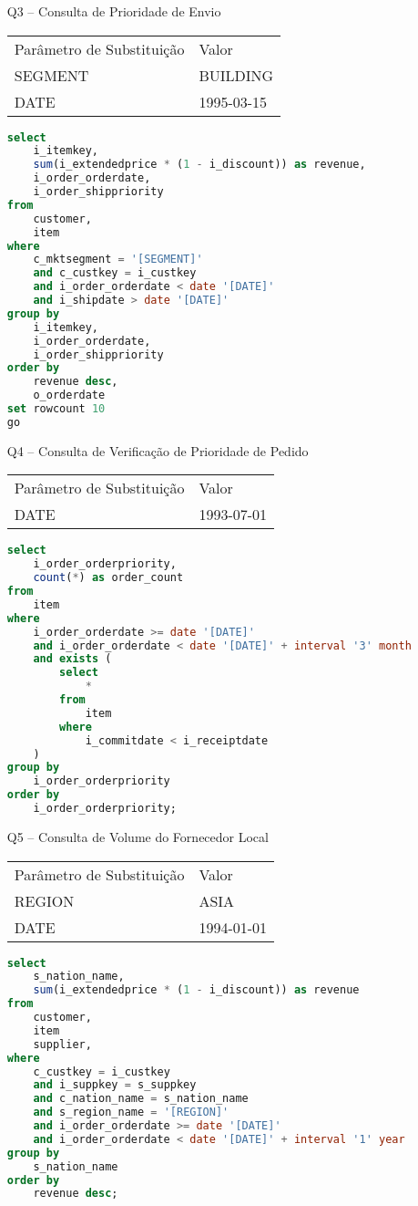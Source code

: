 \begin{enumerate}
\item[Q3 --] Consulta de Prioridade de Envio
	
	\begin{tabular}{ll}
	Parâmetro de Substituição & Valor\\
	SEGMENT & BUILDING\\
	DATE & 1995-03-15\\
\end{tabular}

	\begin{lstlisting}[language=SQL]
select
	i_itemkey,
	sum(i_extendedprice * (1 - i_discount)) as revenue,
	i_order_orderdate,
	i_order_shippriority
from
	customer,
	item
where
	c_mktsegment = '[SEGMENT]'
	and c_custkey = i_custkey
	and i_order_orderdate < date '[DATE]'
	and i_shipdate > date '[DATE]'
group by
	i_itemkey,
	i_order_orderdate,
	i_order_shippriority
order by
	revenue desc,
	o_orderdate
set rowcount 10
go
	\end{lstlisting}
	
\item[Q4 --] Consulta de Verificação de Prioridade de Pedido
	
	\begin{tabular}{ll}
	Parâmetro de Substituição & Valor\\
	DATE & 1993-07-01\\
\end{tabular}

	\begin{lstlisting}[language=SQL]
select
	i_order_orderpriority,
	count(*) as order_count
from
	item
where
	i_order_orderdate >= date '[DATE]'
	and i_order_orderdate < date '[DATE]' + interval '3' month
	and exists (
		select
			*
		from
			item
		where
			i_commitdate < i_receiptdate
	)
group by
	i_order_orderpriority
order by
	i_order_orderpriority;
	\end{lstlisting}

\item[Q5 --] Consulta de Volume do Fornecedor Local
	
	\begin{tabular}{ll}
	Parâmetro de Substituição & Valor\\
	REGION & ASIA\\
	DATE & 1994-01-01\\
\end{tabular}

	\begin{lstlisting}[language=SQL]
select
	s_nation_name,
	sum(i_extendedprice * (1 - i_discount)) as revenue
from
	customer,
	item
	supplier,
where
	c_custkey = i_custkey
	and i_suppkey = s_suppkey
	and c_nation_name = s_nation_name
	and s_region_name = '[REGION]'
	and i_order_orderdate >= date '[DATE]'
	and i_order_orderdate < date '[DATE]' + interval '1' year
group by
	s_nation_name
order by
	revenue desc;
	\end{lstlisting}
	

\end{enumerate}
